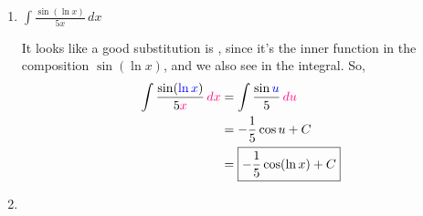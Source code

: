 \documentclass[main]{subfiles}
\begin{document}
\begin{enumerate}
\begin{enumerate}
    \begin{solution}
        It looks like a good substitution is  because it's
      the inner function in the composition $\dfrac{1}{x^2+5}$, and we can
      get  in the integral by multiplying by 
      $\frac{1}{2}\cdot2$. The new bounds will be from $u=6$ to $u=9$.
      \begin{align*}
          \int_1^2 \frac{x}{x^2+5}\,dx &= 
          \frac{1}{2}\int_{x=1}^{x=2} 
          \frac{\subd{2x}}{\sub{x^2+5}}\,\subd{dx} \\
          &= \frac{1}{2}\int_{u=6}^{u=9} \frac{1}{\sub{u}}\,\subd{du} \\
          &= \frac{1}{2} \left[\ln|u|\right]_6^9 \\
          &= \boxed{\frac{1}{2}(\ln 9 - \ln 6)}\\
      \end{align*}
    \end{solution}

  \item
    

    \begin{problem}[\vfill]
      $\displaystyle \int \frac{\sin (\ln x)}{5x}\,dx$
    \end{problem}

    \begin{solution} %
      It looks like a good substitution is , since it's
      the inner function in the composition $\sin(\ln x)$, and we also see
       in the integral.  So,
      \begin{align*}
        \int \frac{\sin (\sub{\ln x})}{5\subd{x}}\,\subd{dx} 
        & =  \int \frac{\sin \sub{u}}{5} \,\subd{du} \\
        & =  -\frac{1}{5} \cos u + C \\
        &= \boxed{-\frac{1}{5} \cos(\ln x) +C}
      \end{align*}
    \end{solution}

  \item


\end{enumerate}
\end{enumerate}
\end{document}
